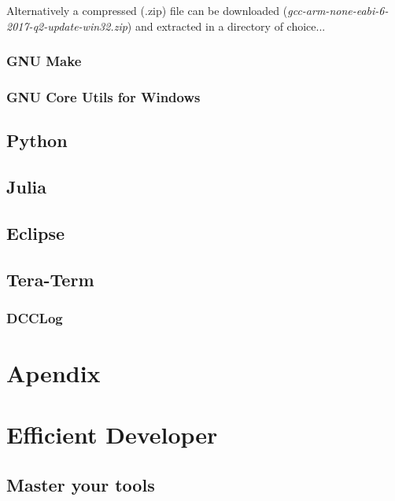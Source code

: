 Alternatively a compressed (.zip) file can be downloaded (\textit{gcc-arm-none-eabi-6-2017-q2-update-win32.zip}) and extracted in a directory of choice...

\subsubsection{GNU Make}

\subsubsection{GNU Core Utils for Windows}

\subsection{Python}

\subsection{Julia}


\subsection{Eclipse}

\subsection{Tera-Term}


\subsubsection{DCCLog}

\section{Apendix}

\section{Efficient Developer}

\subsection{Master your tools}

